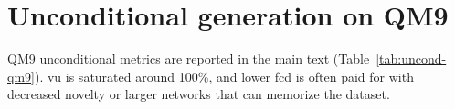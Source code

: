 \section{Unconditional generation on QM9}
\label{app:qm9-uncond}

QM9 unconditional metrics are reported in the main text (Table~\ref{tab:uncond-qm9}). \gls{vu} is
saturated around 100\%, and lower \gls{fcd} is often paid for with decreased novelty or larger networks
that can memorize the dataset.
\FloatBarrier
